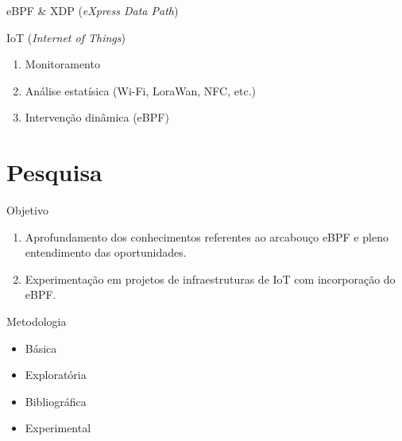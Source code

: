 
\begin{frame}{eBPF \& XDP (\textit{eXpress Data Path})}
\lstI
\end{frame}

\begin{frame}{IoT (\textit{Internet of Things})}
    \begin{enumerate}
        \item Monitoramento
        \item Análise estatísica (Wi-Fi, LoraWan, NFC, etc.)
        \item Intervenção dinâmica (eBPF)
    \end{enumerate}
\end{frame}

\section{Pesquisa}

\begin{frame}{Objetivo}
    \begin{enumerate}
        \item Aprofundamento dos conhecimentos referentes ao arcabouço eBPF e pleno entendimento das oportunidades.
        
        \vspace{30pt}
        
        \item Experimentação em projetos de infraestruturas de IoT com incorporação do eBPF.
    \end{enumerate}
\end{frame}

\begin{frame}{Metodologia}
\begin{itemize}
		\item Básica
		\item Exploratória
		\item Bibliográfica
		\item Experimental
	\end{itemize} 
\end{frame}

